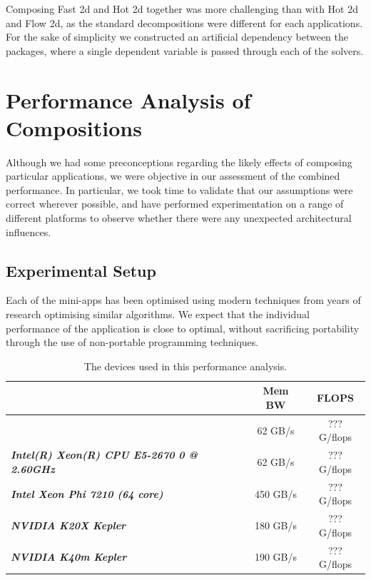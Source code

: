 \documentclass[runningheads,a4paper]{llncs}
\begin{document}
Composing Fast 2d and Hot 2d together was more challenging than with Hot 2d and Flow 2d, as the standard decompositions were different for each applications. For the sake of simplicity we constructed an artificial dependency between the packages, where a single dependent variable is passed through each of the solvers.

\section{Performance Analysis of Compositions}

Although we had some preconceptions regarding the likely effects of composing particular applications, we were objective in our assessment of the combined performance. In particular, we took time to validate that our assumptions were correct wherever possible, and have performed experimentation on a range of different platforms to observe whether there were any unexpected architectural influences.

\subsection{Experimental Setup}

Each of the mini-apps has been optimised using modern techniques from years of research optimising similar algorithms. We expect that the individual performance of the application is close to optimal, without sacrificing portability through the use of non-portable programming techniques. 

\begin{table}[h]
  \begin{center}
    \begin{tabular}{l|c|c}
      \hline
      \textbf{} & \textbf{Mem BW} & \textbf{FLOPS}  \\
      \hline
      \textit{\textbf{}} & 62 GB/s & ??? G/flops \\
      \textit{\textbf{Intel(R) Xeon(R) CPU E5-2670 0 @ 2.60GHz}} & 62 GB/s & ??? G/flops \\
      
      \textit{\textbf{Intel Xeon Phi 7210 (64 core)}} & 450 GB/s & ??? G/flops \\
      \textit{\textbf{NVIDIA K20X Kepler}} & 180 GB/s & ??? G/flops \\
      \textit{\textbf{NVIDIA K40m Kepler}} & 190 GB/s & ??? G/flops \\
    \end{tabular}
  \end{center}
  \caption{The devices used in this performance analysis.}
  \label{tab:hardware}
\end{table}
\end{document}
